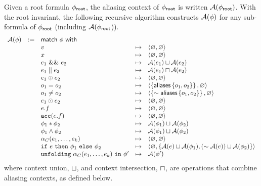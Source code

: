 Given a root formula $\phi_\textsf{root}$, the aliasing context of $\phi_\textsf{root}$ is written $\mathcal{A}(\phi_\textsf{root})$. With the root invariant, the following recursive algorithm constructs $\mathcal{A}(\phi)$ for any sub-formula of $\phi_\textsf{root}$ (including $\mathcal{A}(\phi_\textsf{root}$)).
%
\begin{align*}
\begin{array}{rclcl}
\A(\phi) &:=& \tsf{match} \ \phi \ \tsf{with} \\
&& v &\mt&
  \context{\empty}{\empty}
\\
&& x &\mt&
  \context{\empty}{\empty}
\\
&& e_1 \ \band \ e_2 &\mt&
  \A(e_1) \contextunion \A(e_2)
\\
&& e_1 \bor e_2 &\mt&
  \A(e_1) \contextintersection \A(e_2)
\\
&& e_1 \oplus e_2 &\mt&
  \context{\empty}{\empty}
\\
&& o_1 = o_2 &\mt&
  \context{\set{\aliases\set{o_1, o_2}}}{\empty} %
\\
&& o_1 \neq o_2 &\mt&
  \context{\set{\pnot \aliases\set{o_1, o_2}}}{\empty}
\\
&& e_1 \odot e_2 &\mt&
  \context{\empty}{\empty}
\\
&& e.f &\mt&
  \context{\empty}{\empty}
\\
&& \cacc(e.f) &\mt&
  \context{\empty}{\empty}
\\
&& \phi_1 \ast \phi_2 &\mt&
  \A(\phi_1) \contextunion \A(\phi_2)
\\
&& \phi_1 \land \phi_2 &\mt&
  \A(\phi_1) \contextunion \A(\phi_2)
\\
&& \alpha_C(e_1, \dots, e_k) &\mt&
  \context{\empty}{\empty}
\\
&& \cif \ e \ \cthen \ \phi_1 \ \celse \ \phi_2 &\mt&
  \context{\empty}{\set{ \A(e) \contextunion \A(\phi_1), (\pnot \A(e)) \contextunion \A(\phi_2) }}
\\
&& \cunfolding \ \alpha_C(e_1, \dots, e_k) \ \cin \ \phi\p &\mt&
  \A(\phi\p)
\end{array}
\end{align*}
%
where context union, $\sqcup$, and context intersection, $\sqcap$, are operations that combine aliasing contexts, as defined below.
%

